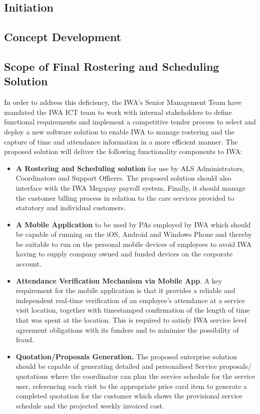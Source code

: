 \documentclass[a4paper,12pt]{article}
\begin{document}
\begin{samepage}
\begin{samepage}
\section {Initiation}
\end{samepage}
\begin{samepage}
\section {Concept Development}



\subsection {Scope of Final Rostering and Scheduling Solution}
In order to address this deficiency, the IWA's Senior Management Team have mandated the IWA ICT team to work with internal stakeholders to define functional requirements and implement a competitive tender process to select and deploy a new software solution to enable IWA to manage rostering and the capture of time and attendance information in a more efficient manner.
The proposed solution will deliver the following functionality components to IWA:
\begin{itemize}
\item \textbf{A Rostering and Scheduling solution} for use by ALS Administrators, Coordinators and Support Officers. The proposed solution should also interface with the IWA Megapay payroll system. Finally, it should manage the customer billing process in relation to the care services provided to statutory and individual customers.
\item \textbf {A Mobile Application} to be used by PAs employed by IWA which should be capable of running on the iOS, Android and Windows Phone and thereby be suitable to run on the personal mobile devices of employees to avoid IWA having to supply company owned and funded devices on the corporate account. 
\item \textbf {Attendance Verification Mechanism via Mobile App}. A key requirement for the mobile application is that it provides a reliable and independent real-time verification of an employee’s attendance at a service visit location, together with timestamped confirmation of the length of time that was spent at the location.  This is required to satisfy IWA service level agreement obligations with its funders and to minimise the possibility of fraud.
\pagebreak
\item\textbf {Quotation/Proposals Generation.} The proposed enterprise solution should be capable of generating detailed and personalised Service proposals/ quotations where the coordinator can plan the service schedule for the service user, referencing each visit to the appropriate price card item to generate a completed quotation for the customer which shows the provisional service schedule and the projected weekly invoiced cost.

\end{itemize}
\end{samepage}
\end{samepage}
\end{document}
